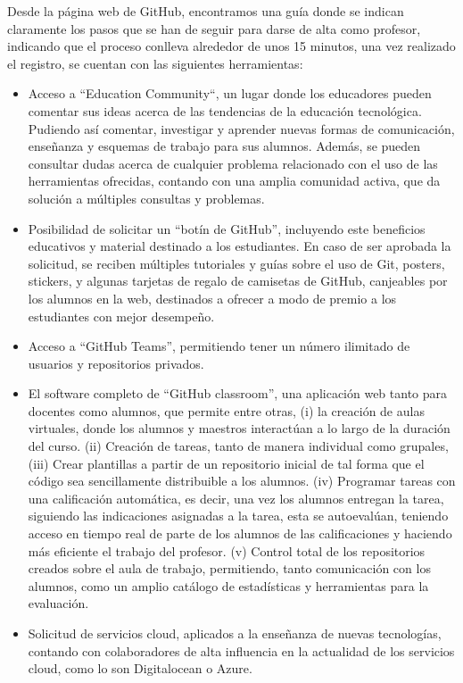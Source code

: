 \begin{itemize}
		Desde la página web de GitHub, encontramos una guía donde se indican claramente los pasos que se han de seguir para darse de alta como profesor, indicando que el proceso conlleva alrededor de unos 15 minutos, una vez realizado el registro, se cuentan con las siguientes herramientas:
		\begin{itemize}
			\item Acceso a “Education Community“, un lugar donde los educadores pueden comentar sus ideas acerca de las tendencias de la educación tecnológica. Pudiendo así comentar, investigar y aprender nuevas formas de comunicación, enseñanza y esquemas de trabajo para sus alumnos. Además, se pueden consultar dudas acerca de cualquier problema relacionado con el uso de las herramientas ofrecidas, contando con una amplia comunidad activa, que da solución a múltiples consultas y problemas.
			\item Posibilidad de solicitar un “botín de GitHub”, incluyendo este beneficios educativos y material destinado a los estudiantes.  En caso de ser aprobada la solicitud, se reciben múltiples tutoriales y guías sobre el uso de Git, posters, stickers, y algunas tarjetas de regalo de camisetas de GitHub, canjeables por los alumnos en la web, destinados a ofrecer a modo de premio a los estudiantes con mejor desempeño.
			\item Acceso a “GitHub Teams”, permitiendo tener un número ilimitado de usuarios y repositorios privados.
			\item El software completo de “GitHub classroom”, una aplicación web tanto para docentes como alumnos, que permite entre otras, (i) la creación de aulas virtuales, donde los alumnos y maestros interactúan a lo largo de la duración del curso. (ii) Creación de tareas, tanto de manera individual como grupales, (iii) Crear plantillas a partir de un repositorio inicial de tal forma que el código sea sencillamente distribuible a los alumnos. (iv) Programar tareas con una calificación automática, es decir, una vez los alumnos entregan la tarea, siguiendo las indicaciones asignadas a la tarea, esta se autoevalúan, teniendo acceso en tiempo real de parte de los alumnos de las calificaciones y haciendo más eficiente el trabajo del profesor. (v) Control total de los repositorios creados sobre el aula de trabajo, permitiendo, tanto comunicación con los alumnos, como un amplio catálogo de estadísticas y herramientas para la evaluación.
			\item Solicitud de servicios cloud, aplicados a la enseñanza de nuevas tecnologías, contando con colaboradores de alta influencia en la actualidad de los servicios cloud, como lo son Digitalocean o Azure.		 
		\end{itemize}
	


\end{itemize}
